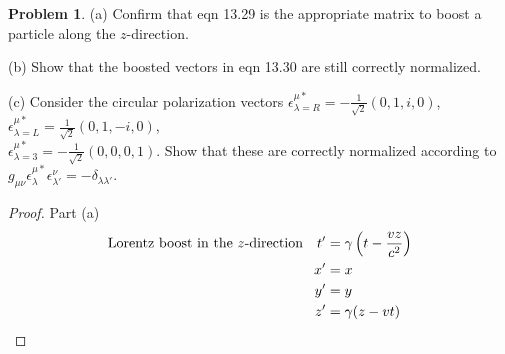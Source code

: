 \documentclass[letterpaper]{article}
\theoremstyle{definition}
\newtheorem{prob}{Problem}[section]
\begin{document}
\begin{prob}
  (a)  Confirm that eqn 13.29 is the appropriate matrix to boost a particle along the $z$-direction.

  (b)  Show that the boosted vectors in eqn 13.30 are still correctly normalized.

  (c)  Consider the circular polarization vectors $\epsilon^{\mu*}_{\lambda=R}=-\frac{1}{\sqrt{2}}(0,1,i,0)$, $\epsilon^{\mu*}_{\lambda=L}=\frac{1}{\sqrt{2}}(0,1,-i,0)$,\\$\epsilon^{\mu*}_{\lambda=3}=-\frac{1}{\sqrt{2}}(0,0,0,1)$. Show that these are correctly normalized according to $g_{\mu\nu}\epsilon^{\mu*}_\lambda \epsilon^\nu_{\lambda'}=-\delta_{\lambda\lambda'}$.
\end{prob}
\begin{proof}Part (a)
  \begin{align*}
    \qq*{Lorentz boost in the $z$-direction}t' & =\gamma\left(t-\frac{vz}{c^2}\right) \\
    x'                                         & =x                                   \\
    y'                                         & =y                                   \\
    z'                                         & =\gamma(z-vt)                        \\
  \end{align*}


\end{proof}
\end{document}
